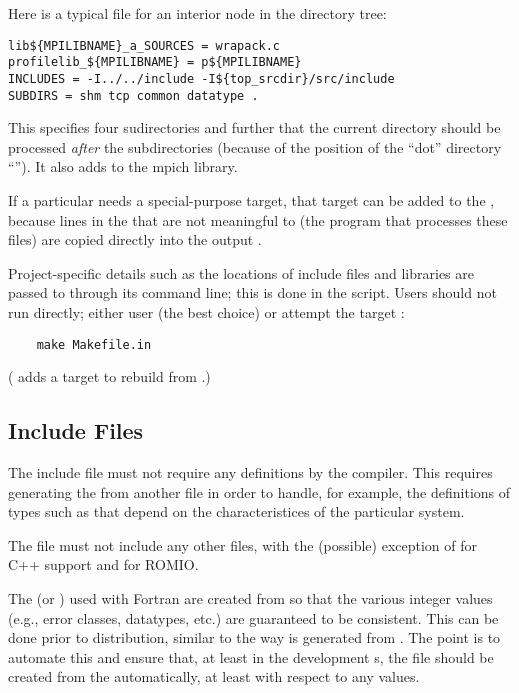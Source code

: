 \documentclass{article}
\begin{document}
Here is a typical  file for an interior node in the
directory tree:
\begin{verbatim}
lib${MPILIBNAME}_a_SOURCES = wrapack.c 
profilelib_${MPILIBNAME} = p${MPILIBNAME}
INCLUDES = -I../../include -I${top_srcdir}/src/include
SUBDIRS = shm tcp common datatype .
\end{verbatim}
This specifies four sudirectories and further that the current directory
should be processed \emph{after} the subdirectories (because of the position
of the ``dot'' directory ``'').  It also adds 
to the mpich library. 

If a particular  needs a special-purpose target, that target
can be added to the , because lines in the
 that are not meaningful to  (the
program that processes these 
files) are copied directly into the output .  

Project-specific details such as the locations of include files and libraries
are passed to  through its command line; this is done in the
 script.  Users should not
run  directly; either user 
(the best choice) or attempt the  target
:
\begin{verbatim}
    make Makefile.in
\end{verbatim}
( adds a target to rebuild  from
.) 

\subsection{Include Files}
The include file  must not require any 
definitions by the compiler.  This requires generating the
 from another file in order to handle, for example, the
definitions of types such as  that depend on the
characteristices of the particular system.

The  file must not include any other
files, with the (possible) exception of  for C++
support and  for ROMIO.

The  (or ) used with Fortran are
created from 
 so that the various integer values (e.g., error classes, 
datatypes, etc.) are guaranteed to be consistent.  This can be done prior to
distribution, similar to the way  is generated from
.  The point is to automate this and ensure that,
at least in the development s, the  file
should be created from the  automatically, at least with
respect to any values. 
\end{document}

